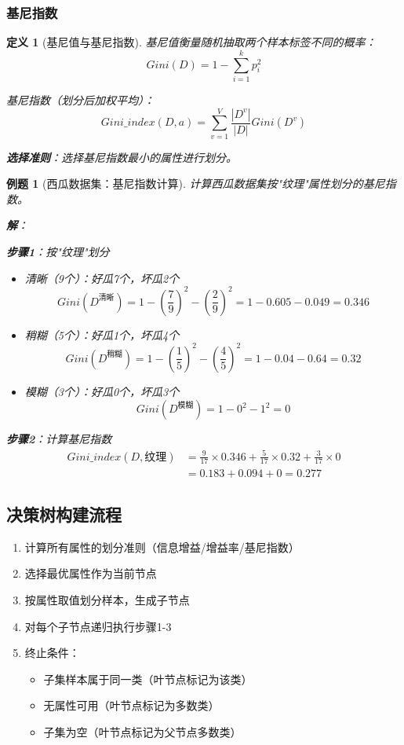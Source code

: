 \documentclass[12pt,a4paper]{ctexart}
\newtheorem{definition}{定义}[section]
\newtheorem{exercise}{例题}[section]
\begin{document}
\subsubsection{基尼指数}

\begin{definition}[基尼值与基尼指数]
基尼值衡量随机抽取两个样本标签不同的概率：
\[
Gini(D) = 1 - \sum_{i=1}^{k} p_i^2
\]

基尼指数（划分后加权平均）：
\[
Gini\_index(D, a) = \sum_{v=1}^{V} \frac{|D^v|}{|D|} Gini(D^v)
\]

\textbf{选择准则}：选择基尼指数最小的属性进行划分。
\end{definition}

\begin{exercise}[西瓜数据集：基尼指数计算]
计算西瓜数据集按"纹理"属性划分的基尼指数。

\textbf{解}：

\textbf{步骤1}：按"纹理"划分
\begin{itemize}
    \item 清晰（9个）：好瓜7个，坏瓜2个
    \[
    Gini(D^{\text{清晰}}) = 1 - \left(\frac{7}{9}\right)^2 - \left(\frac{2}{9}\right)^2 = 1 - 0.605 - 0.049 = 0.346
    \]
    
    \item 稍糊（5个）：好瓜1个，坏瓜4个
    \[
    Gini(D^{\text{稍糊}}) = 1 - \left(\frac{1}{5}\right)^2 - \left(\frac{4}{5}\right)^2 = 1 - 0.04 - 0.64 = 0.32
    \]
    
    \item 模糊（3个）：好瓜0个，坏瓜3个
    \[
    Gini(D^{\text{模糊}}) = 1 - 0^2 - 1^2 = 0
    \]
\end{itemize}

\textbf{步骤2}：计算基尼指数
\begin{align*}
Gini\_index(D, \text{纹理}) &= \frac{9}{17} \times 0.346 + \frac{5}{17} \times 0.32 + \frac{3}{17} \times 0 \\
&= 0.183 + 0.094 + 0 = \boxed{0.277}
\end{align*}
\end{exercise}

\subsection{决策树构建流程}

\begin{enumerate}
    \item 计算所有属性的划分准则（信息增益/增益率/基尼指数）
    \item 选择最优属性作为当前节点
    \item 按属性取值划分样本，生成子节点
    \item 对每个子节点递归执行步骤1-3
    \item 终止条件：
    \begin{itemize}
        \item 子集样本属于同一类（叶节点标记为该类）
        \item 无属性可用（叶节点标记为多数类）
        \item 子集为空（叶节点标记为父节点多数类）
    \end{itemize}
\end{enumerate}
\end{document}
